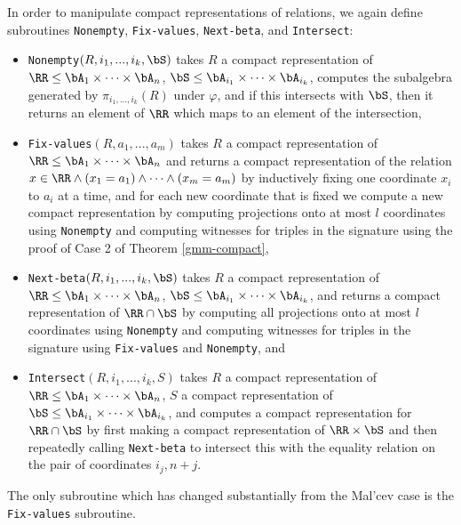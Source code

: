 In order to manipulate compact representations of relations, we again define subroutines \texttt{Nonempty}, \texttt{Fix-values}, \texttt{Next-beta}, and \texttt{Intersect}:
\begin{itemize}
\item \texttt{Nonempty}$(R, i_1, ..., i_k, \bS)$ takes $R$ a compact representation of $\RR \le \bA_1\times \cdots\times \bA_n$, $\bS \le \bA_{i_1} \times \cdots \times \bA_{i_k}$, computes the subalgebra generated by $\pi_{i_1, ..., i_k}(R)$ under $\varphi$, and if this intersects with $\bS$, then it returns an element of $\RR$ which maps to an element of the intersection,

\item \texttt{Fix-values}$(R, a_1, ..., a_m)$ takes $R$ a compact representation of $\RR \le \bA_1\times \cdots\times \bA_n$ and returns a compact representation of the relation $x \in \RR \wedge (x_1 = a_1) \wedge \cdots \wedge (x_m = a_m)$ by inductively fixing one coordinate $x_i$ to $a_i$ at a time, and for each new coordinate that is fixed we compute a new compact representation by computing projections onto at most $l$ coordinates using \texttt{Nonempty} and computing witnesses for triples in the signature using the proof of Case 2 of Theorem \ref{gmm-compact},

\item \texttt{Next-beta}$(R, i_1, ..., i_k, \bS)$ takes $R$ a compact representation of $\RR \le \bA_1\times \cdots\times \bA_n$, $\bS \le \bA_{i_1} \times \cdots \times \bA_{i_k}$, and returns a compact representation of $\RR \cap \bS$ by computing all projections onto at most $l$ coordinates using \texttt{Nonempty} and computing witnesses for triples in the signature using \texttt{Fix-values} and \texttt{Nonempty}, and

\item \texttt{Intersect}$(R, i_1, ..., i_k, S)$ takes $R$ a compact representation of $\RR \le \bA_1\times \cdots\times \bA_n$, $S$ a compact representation of $\bS \le \bA_{i_1} \times \cdots \times \bA_{i_k}$, and computes a compact representation for $\RR\cap \bS$ by first making a compact representation of $\RR\times \bS$ and then repeatedly calling \texttt{Next-beta} to intersect this with the equality relation on the pair of coordinates $i_j,n+j$.
\end{itemize}

The only subroutine which has changed substantially from the Mal'cev case is the \texttt{Fix-values} subroutine.

